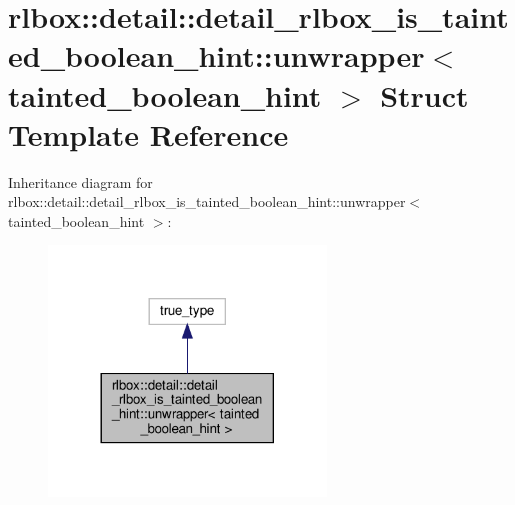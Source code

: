 \hypertarget{structrlbox_1_1detail_1_1detail__rlbox__is__tainted__boolean__hint_1_1unwrapper_3_01tainted__boolean__hint_01_4}{}\section{rlbox\+:\+:detail\+:\+:detail\+\_\+rlbox\+\_\+is\+\_\+tainted\+\_\+boolean\+\_\+hint\+:\+:unwrapper$<$ tainted\+\_\+boolean\+\_\+hint $>$ Struct Template Reference}
\label{structrlbox_1_1detail_1_1detail__rlbox__is__tainted__boolean__hint_1_1unwrapper_3_01tainted__boolean__hint_01_4}


Inheritance diagram for rlbox\+:\+:detail\+:\+:detail\+\_\+rlbox\+\_\+is\+\_\+tainted\+\_\+boolean\+\_\+hint\+:\+:unwrapper$<$ tainted\+\_\+boolean\+\_\+hint $>$\+:
\nopagebreak
\begin{figure}[H]
\begin{center}
\leavevmode
\includegraphics[width=209pt]{structrlbox_1_1detail_1_1detail__rlbox__is__tainted__boolean__hint_1_1unwrapper_3_01tainted__boolean__hint_01_4__inherit__graph}
\end{center}
\end{figure}


